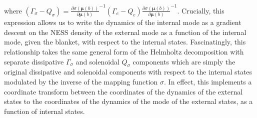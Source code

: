 where $(\Gamma_\sigma - Q_\sigma) = \frac{\partial \sigma(\boldsymbol{\mu}(b))}{\partial \boldsymbol{\mu}(b)}^{-1} (\Gamma_e - Q_e) \frac{\partial \sigma(\boldsymbol{\mu}(b))}{\partial \boldsymbol{\mu}(b)}^{-1}$. Crucially, this expression allows us to write the dynamics of the internal mode as a gradient descent on the NESS density of the external mode as a function of the internal mode, given the blanket, with respect to the internal states. Fascinatingly, this relationship takes the same general form of the Helmholtz decomposition with separate dissipative $\Gamma_\sigma$ and solenoidal $Q_\sigma$ components which are simply the original dissipative and solenoidal components with respect to the internal states modulated by the inverse of the mapping function $\sigma$. In effect, this implements a coordinate transform between the coordinates of the dynamics of the external states to the coordinates of the dynamics of the mode of the external states, as a function of internal states.

